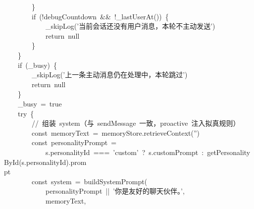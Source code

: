\documentclass[a4paper,10pt]{article}
\begin{document}
{~~~~~~~~\}\\
~~~~~~~~if~(!debugCountdown~\&\&~!\_lastUserAt())~\{\\
~~~~~~~~~~~~\_skipLog('当前会话还没有用户消息，本轮不主动发送')\\
~~~~~~~~~~~~return~null\\
~~~~~~~~\}\\
~~~~\}\\
~~~~if~(\_busy)~\{\\
~~~~~~~~\_skipLog('上一条主动消息仍在处理中，本轮跳过')\\
~~~~~~~~return~null\\
~~~~\}\\
~~~~\_busy~=~true\\
~~~~try~\{\\
~~~~~~~~//~组装~system（与~sendMessage~一致，proactive~注入拟真规则）\\
~~~~~~~~const~memoryText~=~memoryStore.retrieveContext('')\\
~~~~~~~~const~personalityPrompt~=\\
~~~~~~~~~~~~s.personalityId~===~'custom'~?~s.customPrompt~:~getPersonalityById(s.personalityId).prom\\
pt\\
~~~~~~~~const~system~=~buildSystemPrompt(\\
~~~~~~~~~~~~personalityPrompt~||~'你是友好的聊天伙伴。',\\
~~~~~~~~~~~~memoryText,
}

\newpage
\end{document}
